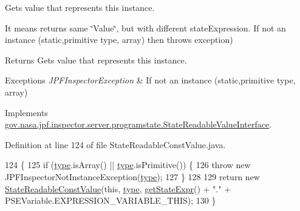 Gets value that represents this instance. 

It means returns same \char`\"{}\+Value\char`\"{}, but with different state\+Expression. If not an instance (static,primitive type, array) then throws exception)

\begin{DoxyReturn}{Returns}
Gets value that represents this instance. 
\end{DoxyReturn}

\begin{DoxyExceptions}{Exceptions}
{\em J\+P\+F\+Inspector\+Exception} & If not an instance (static,primitive type, array) \\
\hline
\end{DoxyExceptions}


Implements \hyperlink{interfacegov_1_1nasa_1_1jpf_1_1inspector_1_1server_1_1programstate_1_1_state_readable_value_interface_a726b9bd70d7e76da89660f6a614d7fe1}{gov.\+nasa.\+jpf.\+inspector.\+server.\+programstate.\+State\+Readable\+Value\+Interface}.



Definition at line 124 of file State\+Readable\+Const\+Value.\+java.


\begin{DoxyCode}
124                                                                                      \{
125     \textcolor{keywordflow}{if} (\hyperlink{classgov_1_1nasa_1_1jpf_1_1inspector_1_1server_1_1programstate_1_1_state_readable_const_value_aecceaedabb6d497ea088f90bea912c5c}{type}.isArray() || \hyperlink{classgov_1_1nasa_1_1jpf_1_1inspector_1_1server_1_1programstate_1_1_state_readable_const_value_aecceaedabb6d497ea088f90bea912c5c}{type}.isPrimitive()) \{
126       \textcolor{keywordflow}{throw} \textcolor{keyword}{new} JPFInspectorNotInstanceException(\hyperlink{classgov_1_1nasa_1_1jpf_1_1inspector_1_1server_1_1programstate_1_1_state_readable_const_value_aecceaedabb6d497ea088f90bea912c5c}{type});
127     \}
128 
129     \textcolor{keywordflow}{return} \textcolor{keyword}{new} \hyperlink{classgov_1_1nasa_1_1jpf_1_1inspector_1_1server_1_1programstate_1_1_state_readable_const_value_a75d1dbe2b2dabf1036db1f943a8e5bda}{StateReadableConstValue}(\textcolor{keyword}{this}, \hyperlink{classgov_1_1nasa_1_1jpf_1_1inspector_1_1server_1_1programstate_1_1_state_readable_const_value_aecceaedabb6d497ea088f90bea912c5c}{type}, 
      \hyperlink{classgov_1_1nasa_1_1jpf_1_1inspector_1_1server_1_1programstate_1_1_state_node_a54c1c8d91f93c078171589f844252bdf}{getStateExpr}() + \textcolor{stringliteral}{"."} + PSEVariable.EXPRESSION\_VARIABLE\_THIS);
130   \}
\end{DoxyCode}
